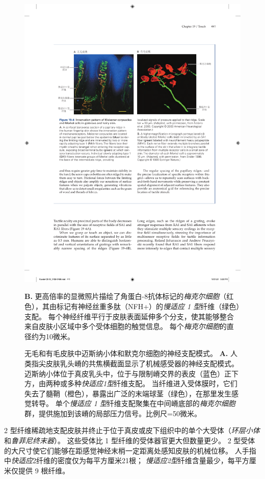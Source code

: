 \begin{figure}[htbp]
	\centering
	\includegraphics[width=1.0\linewidth]{chap19/fig_19_4}
	\caption{无毛和有毛皮肤中迈斯纳小体和默克尔细胞的神经支配模式。
		\textbf{A.} 人类指尖皮肤乳头嵴的共焦横截面显示了机械感受器的神经支配模式。
		迈斯纳小体位于真皮乳头中，位于与限制嵴交界的表皮（蓝色）正下方，由两种或多种\textit{快适应1型}纤维支配。
		当纤维进入受体膜时，它们失去了髓鞘（橙色），暴露出广泛的末端球茎（绿色），在那里发生感觉转导。
		单个\textit{慢适应 1 型}纤维支配聚集在中间嵴底部的\textit{梅克尔细胞}群，提供施加到该嵴的局部压力信号。比例尺=50微米。}
		\textbf{B.} 更高倍率的显微照片描绘了角蛋白-8抗体标记的\textit{梅克尔细胞}（红色），其由标记有神经丝重多肽（NFH+）的\textit{慢适应 1 型}纤维（绿色）支配。
		每个神经纤维平行于皮肤表面延伸多个分支，使其能够整合来自皮肤小区域中多个受体细胞的触觉信息。
		每个\textit{梅克尔细胞}的直径约为10微米。
	\label{fig:19_4}
\end{figure}


2 型纤维稀疏地支配皮肤并终止于位于真皮或皮下组织中的单个大受体（\textit{环层小体}和\textit{鲁菲尼终末器}）。 
这些受体比 1 型纤维的受体器官更大但数量更少。
2 型受体的大尺寸使它们能够在距感觉神经末梢一定距离处感知皮肤的机械位移。
人手指中\textit{快适应}2纤维的密度仅为每平方厘米21根；
\textit{慢适应2型}纤维含量最少，每平方厘米仅提供 9 根纤维。


